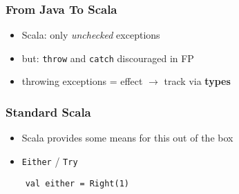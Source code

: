 \documentclass{beamer}
\begin{document}
\begin{frame}
  \frametitle{From Java To Scala}
  \begin{itemize}
  \item Scala: only \textit{unchecked} exceptions
  \item but: \texttt{throw} and \texttt{catch} discouraged in FP
  \item throwing exceptions = effect $\rightarrow$ track via \textbf{types}
  \end{itemize}
\end{frame}

\begin{frame}[fragile]
  \frametitle{Standard Scala}
  \begin{itemize}
  \item Scala provides some means for this out of the box
  \item \texttt{Either} / \texttt{Try}
  \end{itemize}
  \begin{verbatim}
    val either = Right(1)
  \end{verbatim}

\end{frame}
\end{document}
